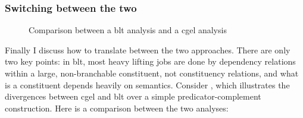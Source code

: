 \documentclass[UTF8, a4paper, oneside, scheme=plain]{ctexart}
\begin{document}
\subsubsection{Switching between the two}

\begin{figure}
    \centering
    
    \caption{Comparison between a \ac{blt} analysis and a \ac{cgel} analysis}
    \label{fig:simple-clause-compare}
\end{figure}

Finally I discuss how to translate between the two approaches.
There are only two key points:
in \ac{blt}, most heavy lifting jobs are done by dependency relations within a large, non-branchable constituent, 
not constituency relations,
and what is a constituent depends heavily on semantics.
Consider ,
which illustrates the divergences between \ac{cgel} and \ac{blt} 
over a simple predicator-complement construction.
Here is a comparison between the two analyses:
\end{document}
